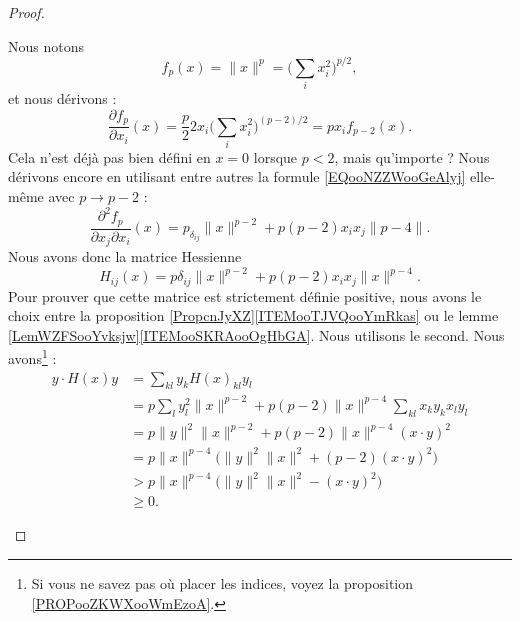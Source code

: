 \begin{proof}
	\begin{subproof}
		\spitem[La Hessienne]
		Nous notons
		\begin{equation}
			f_p(x)=\| x \|^p=\big( \sum_ix_i^2 \big)^{p/2},
		\end{equation}
		et nous dérivons :
		\begin{equation}        \label{EQooNZZWooGeAlyj}
			\frac{ \partial f_p }{ \partial x_i }(x)=\frac{ p }{2}2x_i\big( \sum_ix_i^2 \big)^{(p-2)/2}=px_if_{p-2}(x).
		\end{equation}
		Cela n'est déjà pas bien défini en \( x=0\) lorsque \( p<2\), mais qu'importe ? Nous dérivons encore en utilisant entre autres la formule \eqref{EQooNZZWooGeAlyj} elle-même avec \( p\to p-2\) :
		\begin{equation}
			\frac{ \partial^2f_p  }{ \partial x_j\partial x_i }(x)=p_{\delta_{ij}}\| x \|^{p-2}+p(p-2)x_ix_j\| p-4 \|.
		\end{equation}
		Nous avons donc la matrice Hessienne
		\begin{equation}
			H_{ij}(x)=p\delta_{ij}\| x \|^{p-2}+p(p-2)x_ix_j\| x \|^{p-4}.
		\end{equation}
		Pour prouver que cette matrice est strictement définie positive, nous avons le choix entre la proposition \ref{PropcnJyXZ}\ref{ITEMooTJVQooYmRkas} ou le lemme \ref{LemWZFSooYvksjw}\ref{ITEMooSKRAooOgHbGA}. Nous utilisons le second. Nous avons\footnote{Si vous ne savez pas où placer les indices, voyez la proposition \ref{PROPooZKWXooWmEzoA}.} :
		\begin{subequations}
			\begin{align}
				y\cdot H(x)y & = \sum_{kl}y_kH(x)_{kl}y_l                                                                      \\
				             & = p\sum_ly_l^2\| x \|^{p-2}+p(p-2)\| x \|^{p-4}\sum_{kl}x_ky_kx_ly_l                            \\
				             & = p\| y \|^2\| x \|^{p-2}+p(p-2)\| x \|^{p-4}(x\cdot y)^2                                       \\
				             & = p\| x \|^{p-4}\big( \| y \|^2\| x \|^2+(p-2)(x\cdot y)^2 \big)                                \\
				             & > p\| x \|^{p-4}\big( \| y \|^2\| x \|^2-(x\cdot y)^2 \big)         \label{SUBEQooUSZOooCqgWPE} \\
				             & \geq  0           \label{SUBEQooBXQKooZcarVv}.
			\end{align}
		\end{subequations}

\end{subproof}
\end{proof}
